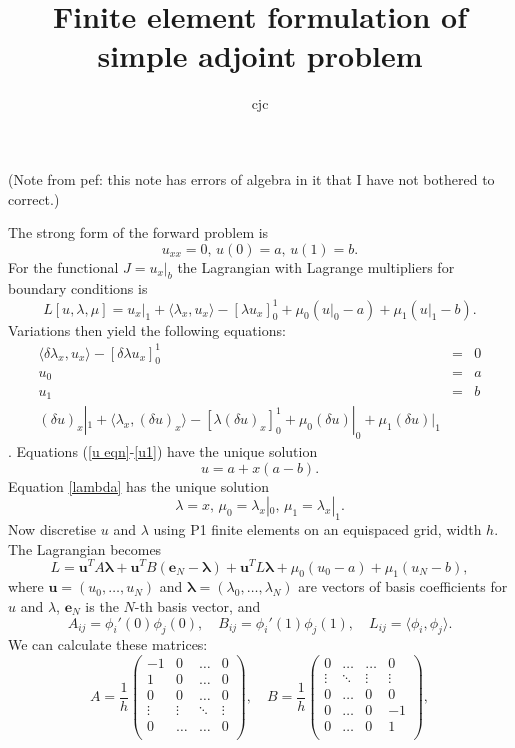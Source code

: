 \documentclass{article}
\def\MM#1{\boldsymbol{#1}}
\begin{document}
\title{Finite element formulation of simple adjoint problem}
\author{cjc}
\maketitle

(Note from pef: this note has errors of algebra in it that I have not bothered to correct.)

The strong form of the forward problem is
\[
u_{xx} = 0, \, u(0)=a, \, u(1) = b.
\]
For the functional $J=u_x|_b$ the Lagrangian with Lagrange multipliers
for boundary conditions is
\[
L[u,\lambda,\mu] = u_x|_1 + \langle \lambda_x,u_x\rangle - 
[\lambda u_x]_0^1 + \mu_0(u|_0-a) + \mu_1(u|_1-b).
\]
Variations then yield the following equations:
\begin{eqnarray}
\label{u eqn}
\langle \delta\lambda_x,u_x\rangle - [\delta\lambda u_x]_0^1 & = & 0 \\
\label{u0}
u_0 & = & a\\
\label{u1}
u_1 & = & b\\
\label{lambda}
\left(\delta u\right)_x|_1 + \langle \lambda_x,(\delta u)_x\rangle -
[\lambda (\delta u)_x]_0^1 + \mu_0(\delta u)|_0 + \mu_1(\delta u)|_1
\end{eqnarray}.
Equations (\ref{u eqn}-\ref{u1}) have the unique solution
\[
u = a + x(a-b).
\]
Equation \eqref{lambda} has the unique solution
\[
\lambda = x, \, \mu_0=\lambda_x|_0, \, \mu_1=\lambda_x|_1.
\]
Now discretise $u$ and $\lambda$ using P1 finite elements on an
equispaced grid, width $h$. The Lagrangian becomes
\[
L = \MM{u}^TA\MM{\lambda} + \MM{u}^TB\left(\MM{e}_N-\MM{\lambda}\right)
 + \MM{u}^TL\MM{\lambda} + \mu_0(u_0-a) + \mu_1(u_N-b),
\]
where $\MM{u}=(u_0,\ldots,u_N)$ and
$\MM{\lambda}=(\lambda_0,\ldots,\lambda_N)$ are vectors of basis
coefficients for $u$ and $\lambda$, $\MM{e}_N$ is the $N$-th basis vector,
and
\[
A_{ij} = \phi_i'(0)\phi_j(0), \quad
B_{ij} = \phi_i'(1)\phi_j(1), \quad
L_{ij} = \langle \phi_i,\phi_j\rangle.
\]
We can calculate these matrices:
\[
A = \frac{1}{h}
\begin{pmatrix}
-1 & 0 & \ldots & 0 \\
1 & 0 & \ldots & 0 \\
0 & 0 & \ldots & 0 \\
\vdots & \vdots & \ddots & \vdots \\
0 & \ldots & \ldots & 0 \\
\end{pmatrix}
,
\quad
B= \frac{1}{h}
\begin{pmatrix}
0 & \ldots & \ldots & 0 \\
\vdots & \ddots & \vdots & \vdots \\
0 & \ldots & 0 & 0 \\
0 & \ldots & 0 & -1\\
0 & \ldots & 0 & 1\\
\end{pmatrix},
\]
\end{document}
